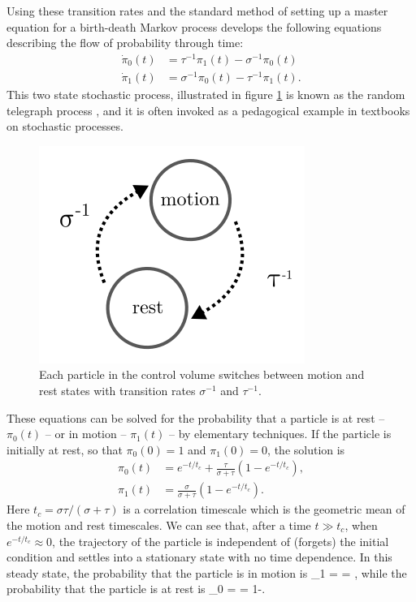 Using these transition rates and the standard method of setting up a master equation for a birth-death Markov process \citep[e.g.]{Cox1965, Pielou1977, Gillespie1992} develops the following equations describing the flow of probability through time: 
\begin{align} 
\dot{\pi}_0(t) &= \tau^{-1} \pi_1(t) - \sigma^{-1} \pi_0(t) \label{eq:anceymaster2006}\\
\dot{\pi}_1(t) &= \sigma^{-1} \pi_0(t) - \tau^{-1} \pi_1(t).
\end{align}
This two state stochastic process, illustrated in figure \ref{fig:telegraph} is known as the random telegraph process \citep{Gillespie1992, Gardiner1983}, and it is often invoked as a pedagogical example in textbooks on stochastic processes.   

\begin{figure}
  \includegraphics[width=.98\linewidth]{./figures/telegraph.png}
  \caption{Each particle in the control volume switches between motion and rest states with transition rates $\sigma^{-1}$ and $\tau^{-1}$.\label{fig:telegraph}}
\end{figure}

These equations can be solved for the probability that a particle is at rest -- $\pi_0(t)$ -- or in motion -- $\pi_1(t)$ -- by elementary techniques. 
If the particle is initially at rest, so that $\pi_0(0)=1$ and $\pi_1(0)=0$, the solution is 
\begin{align} \label{eq:anc2006}
\pi_0(t) &=  e^{-t/t_c} + \frac{\tau}{\sigma + \tau}(1-e^{-t/t_c}),\\
\pi_1(t) &= \frac{\sigma}{\sigma + \tau}(1-e^{-t/t_c}).
\end{align}
Here $t_c = \sigma \tau/(\sigma + \tau)$ is a correlation timescale which is the geometric mean of the motion and rest timescales. 
We can see that, after a time $t\gg t_c$, when $e^{-t/t_c} \approx 0$, the trajectory of the particle is independent of (forgets) the initial condition and settles into a stationary state with no time dependence. 
In this steady state, the probability that the particle is in motion is 
\be \pi_1 = \frac{\tau}{\sigma+\tau} = \xi,\ee
while the probability that the particle is at rest is 
\be \pi_0 = \frac{\sigma}{\sigma+\tau} = 1-\xi.\ee

